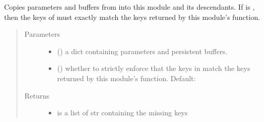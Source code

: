 \documentclass[letterpaper,10pt,english]{sphinxmanual}
\begin{document}
\begin{fulllineitems}
\begin{fulllineitems}
\end{fulllineitems}


\begin{fulllineitems}
\label{\detokenize{api/dynamics:geology.metamodelling.dynamics.LatentSpaceDynamics.load_state_dict}}
Copies parameters and buffers from {\hyperref[\detokenize{api/dynamics:geology.metamodelling.dynamics.LatentSpaceDynamics.state_dict}]{}} into
this module and its descendants. If  is , then
the keys of {\hyperref[\detokenize{api/dynamics:geology.metamodelling.dynamics.LatentSpaceDynamics.state_dict}]{}} must exactly match the keys returned
by this module’s  function.
\begin{quote}\begin{description}
\item[{Parameters}] \leavevmode\begin{itemize}
\item {} 
 () \textendash{} a dict containing parameters and
persistent buffers.

\item {} 
 (\sphinxstyleliteralemphasis{\sphinxupquote{, }}) \textendash{} whether to strictly enforce that the keys
in {\hyperref[\detokenize{api/dynamics:geology.metamodelling.dynamics.LatentSpaceDynamics.state_dict}]{}} match the keys returned by this module’s
 function. Default: 

\end{itemize}

\item[{Returns}] \leavevmode
\begin{itemize}
\item {} 
 is a list of str containing the missing keys


\end{itemize}
\end{description}
\end{quote}
\end{fulllineitems}
\end{fulllineitems}
\end{document}
